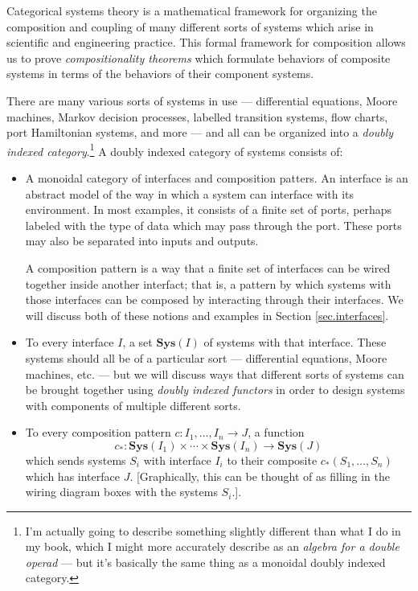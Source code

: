 \documentclass{article}
\begin{document}
Categorical systems theory is a mathematical framework for organizing the
composition and coupling of many different sorts of systems which arise in
scientific and engineering practice. This formal framework for composition
allows us to prove \emph{compositionality theorems} which formulate
behaviors of composite systems in terms of the behaviors of their component systems.

There are many various sorts of systems in use --- differential equations, Moore
machines, Markov decision processes, labelled transition systems, flow charts,
port Hamiltonian systems, and more --- and all can be organized into a
\emph{doubly indexed category}.\footnote{I'm actually going to describe
  something slightly different than what I do in my book, which I might more
  accurately describe as an \emph{algebra for a double operad} --- but it's
  basically the same thing as a monoidal doubly indexed category.} A doubly indexed category of systems consists
of:
\begin{itemize}
  \item A monoidal category of interfaces and composition patters. An
    interface is an abstract model of the way in which a system can interface
    with its environment. In most examples, it consists of a finite set of
    ports, perhaps labeled with the type of data which may pass through the
    port. These ports may also be separated into inputs and outputs.

    A composition pattern is a way that a finite set of interfaces can be wired
    together inside another interfact; that is, a pattern by which systems with
    those interfaces can be composed by interacting through their interfaces. We
    will discuss both of these notions and examples in Section
    \ref{sec.interfaces}.
    \item To every interface $I$, a set $\textbf{Sys}(I)$ of systems with that interface. These
      systems should all be of a particular sort --- differential equations,
      Moore machines, etc. --- but we will discuss ways that different sorts of
      systems can be brought together using \emph{doubly indexed functors} in
      order to design systems with components of multiple different sorts.
    \item To every composition pattern $c : I_1,\ldots, I_n \to J$, a function
      \[
        c_{\ast} : \textbf{Sys}(I_1) \times \cdots \times \textbf{Sys}(I_n) \to \textbf{Sys}(J)
      \]
      which sends systems $S_i$ with interface $I_i$ to their composite
      $c_{\ast}(S_1, \ldots, S_n)$ which has interface $J$. [Graphically, this
      can be thought of as filling in the wiring diagram boxes with the systems $S_i$.].
\end{itemize}
\end{document}
